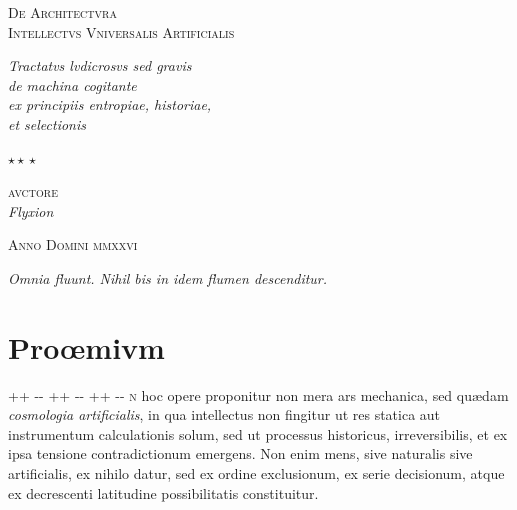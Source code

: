 \documentclass[12pt, oneside, openany]{memoir}
\newlength{\dropcapwidth}   \setlength{\dropcapwidth}{26pt}   %
\newlength{\dropcapgap}     \setlength{\dropcapgap}{5pt}      %
\newcommand{\dropcap}[2]{%
  \noindent
  \parshape=4
    \dimexpr\parindent+\dropcapwidth+\dropcapgap\relax
    \dimexpr\linewidth-\dropcapwidth-\dropcapgap\relax
    \dimexpr\parindent+\dropcapwidth+\dropcapgap\relax
    \dimexpr\linewidth-\dropcapwidth-\dropcapgap\relax
    \dimexpr\parindent+\dropcapwidth+\dropcapgap\relax
    \dimexpr\linewidth-\dropcapwidth-\dropcapgap\relax
    \parindent \linewidth
  \llap{%
    \hspace*{\parindent}%
    \raisebox{-\baselineskip}[0pt][0pt]{%
      \fontsize{32}{32}\selectfont\color{rubricate}#1%
    }%
    \hspace{\dropcapgap}%
  }%
  \textsc{#2}%
}
\newcommand{\rubric}[1]{{\color{rubricate}#1}}
\newcommand{\mytitlerule}{{\color{rubricate}\rule{\linewidth}{0.5pt}}}
\begin{document}
\thispagestyle{empty}
\vspace*{16mm}
\begin{center}
  {\color{rubricate}\scshape\Large
    De Architectvra\\[5pt]
    Intellectvs Vniversalis Artificialis}

  \bigskip\mytitlerule\bigskip

  {\itshape\normalsize
    Tractatvs lvdicrosvs sed gravis\\[3pt]
    de machina cogitante\\[3pt]
    ex principiis entropiae, historiae,\\[3pt]
    et selectionis}

  \vspace{14mm}
  {\color{capgold}\Large$\star\!\star\!\star$}
  \vspace{14mm}

  {\scshape\small avctore}\\[4pt]
  {\itshape\large Flyxion}

  \vspace{12mm}\mytitlerule\vspace{8mm}
  {\scriptsize\scshape\color{rubricate} Anno Domini \textsc{mmxxvi}}
\end{center}
\vfill
{\centering\color{rubricate}\footnotesize\itshape
  Omnia fluunt. Nihil bis in idem flumen descenditur.\par}
\clearpage

\chapter*{\rubric{Pro\oe{}mivm}}
\thispagestyle{fancy}

\dropcap{I}{n} hoc opere proponitur non mera ars mechanica, sed qu\ae{}dam
\emph{cosmologia artificialis}, in qua intellectus non fingitur ut res statica
aut instrumentum calculationis solum, sed ut processus historicus,
irreversibilis, et ex ipsa tensione contradictionum emergens. Non enim mens,
sive naturalis sive artificialis, ex nihilo datur, sed ex ordine exclusionum,
ex serie decisionum, atque ex decrescenti latitudine possibilitatis
constituitur.
\end{document}
